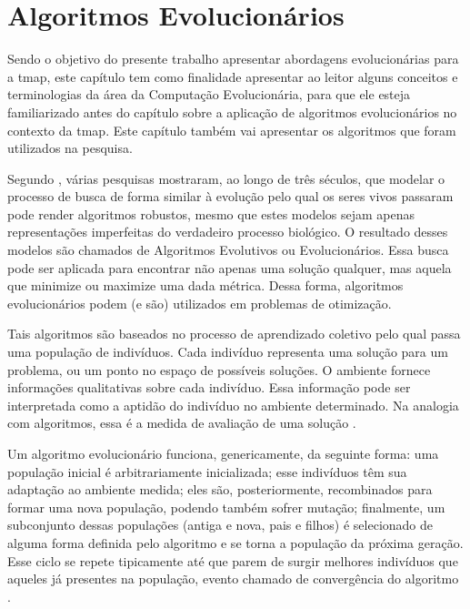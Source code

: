 \chapter{Algoritmos Evolucionários}

Sendo o objetivo do presente trabalho apresentar abordagens evolucionárias para 
a \ac{tmap}, este capítulo tem como finalidade apresentar ao leitor alguns 
conceitos e terminologias da área da Computação Evolucionária, para que ele 
esteja familiarizado antes do capítulo sobre a aplicação de algoritmos 
evolucionários no contexto da \ac{tmap}. Este capítulo também vai apresentar os 
algoritmos que foram utilizados na pesquisa.

Segundo \citep{Back:1993:OEA:1326623.1326625}, várias pesquisas mostraram, ao 
longo de três séculos, que modelar o processo de busca de forma similar à evolução 
pelo qual os seres vivos passaram pode render algoritmos robustos, mesmo que 
estes modelos sejam apenas representações imperfeitas do verdadeiro processo 
biológico. O resultado desses modelos são chamados de Algoritmos Evolutivos ou 
Evolucionários. Essa busca pode ser aplicada para encontrar não apenas uma 
solução qualquer, mas aquela que minimize ou maximize uma dada métrica. Dessa 
forma, algoritmos evolucionários podem (e são) utilizados em problemas de 
otimização.

Tais algoritmos são baseados no processo de aprendizado coletivo pelo qual passa 
uma população de indivíduos. Cada indivíduo representa uma solução para um 
problema, ou um ponto no espaço de possíveis soluções. O ambiente fornece 
informações qualitativas sobre cada indivíduo. Essa informação pode ser 
interpretada como a aptidão do indivíduo no ambiente determinado. Na 
analogia com algoritmos, essa é a medida de avaliação de uma solução 
\citep{Back:1993:OEA:1326623.1326625}.

Um algoritmo evolucionário funciona, genericamente, da seguinte forma: uma 
população inicial é arbitrariamente inicializada; esse indivíduos têm sua 
adaptação ao ambiente medida; eles são, posteriormente, recombinados para formar 
uma nova população, podendo também sofrer mutação; finalmente, um subconjunto 
dessas populações (antiga e nova, pais e filhos) é selecionado de alguma forma 
definida pelo algoritmo e se torna a população da próxima geração. Esse ciclo 
se repete tipicamente até que parem de surgir melhores indivíduos que aqueles já 
presentes na população, evento chamado de convergência do algoritmo 
\citep{Back:1993:OEA:1326623.1326625}.

